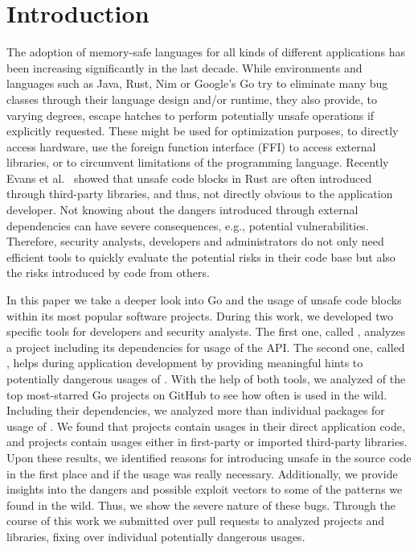 \section{Introduction}
\label{sec:intro}

The adoption of memory-safe languages for all kinds of different applications has been increasing significantly in the last decade. 
While environments and languages such as Java, Rust, Nim or Google's Go try to eliminate many bug classes through their language design and/or runtime, they also provide, to varying degrees, escape hatches to perform potentially unsafe operations if explicitly requested.
These might be used for optimization purposes, to directly access hardware, use the foreign function interface (FFI) to access external libraries, or to circumvent limitations of the programming language.
Recently Evans et al.~\cite{evans2020} showed that unsafe code blocks in Rust are often introduced through third-party libraries, and thus, not directly obvious to the application developer. 
Not knowing about the dangers introduced through external dependencies can have severe consequences, e.g., potential vulnerabilities.
Therefore, security analysts, developers and administrators do not only need efficient tools to quickly evaluate the potential risks in their code base but also the risks introduced by code from others.

In this paper we take a deeper look into Go and the usage of unsafe code blocks within its most popular software projects. 
During this work, we developed two specific tools for developers and security analysts.
The first one, called \toolUsage{}, analyzes a project including its dependencies for usage of the \unsafe{} API. %
The second one, called \toolSA{}, helps during application development by providing meaningful hints to potentially dangerous usages of \unsafe{}.
With the help of both tools, we analyzed \projsAnalyzed{} of the top \initalProjs{} most-starred Go projects on GitHub to see how often \unsafe{} is used in the wild. 
Including their dependencies, we analyzed more than \packagesAnalyzedRounded{} individual packages for usage of \unsafe{}.
We found that \percentageProjectsWithUnsafe{} projects contain \unsafe{} usages in their direct application code, and \percentageProjectsAndDependenciesUnsafe{}
projects contain \unsafe{} usages either in first-party or imported third-party libraries.
Upon these results, we identified reasons for introducing unsafe in the source code in the first place and if the usage was really necessary. 
Additionally, we provide insights into the dangers and possible exploit vectors to some of the patterns we found in the wild. 
Thus, we show the severe nature of these bugs.
Through the course of this work we submitted over \numberPRs{} pull requests to analyzed projects and libraries, fixing over \numberBugsFixed{} individual potentially dangerous \unsafe{} usages.

